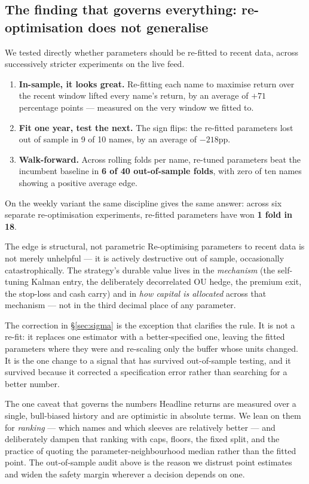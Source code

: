 \documentclass[11pt]{article}
\begin{document}
\subsection{The finding that governs everything: re-optimisation does not generalise}
\label{sec:noreopt}
We tested directly whether parameters should be re-fitted to recent data, across successively
stricter experiments on the live feed.
\begin{enumerate}[topsep=2pt,itemsep=2pt]
\item \textbf{In-sample, it looks great.} Re-fitting each name to maximise return over the recent
      window lifted every name's return, by an average of $+71$ percentage points --- measured on
      the very window we fitted to.
\item \textbf{Fit one year, test the next.} The sign flips: the re-fitted parameters lost out of
      sample in 9 of 10 names, by an average of $-218$pp.
\item \textbf{Walk-forward.} Across rolling folds per name, re-tuned parameters beat the
      incumbent baseline in \textbf{6 of 40 out-of-sample folds}, with zero of ten names showing
      a positive average edge.
\end{enumerate}
On the weekly variant the same discipline gives the same answer: across six separate
re-optimisation experiments, re-fitted parameters have won \textbf{1 fold in 18}.

\begin{keybox}{The edge is structural, not parametric}
Re-optimising parameters to recent data is not merely unhelpful --- it is actively destructive out
of sample, occasionally catastrophically. The strategy's durable value lives in the
\emph{mechanism} (the self-tuning Kalman entry, the deliberately decorrelated OU hedge, the
premium exit, the stop-loss and cash carry) and in \emph{how capital is allocated} across that
mechanism --- not in the third decimal place of any parameter.

The correction in \S\ref{sec:sigma} is the exception that clarifies the rule. It is not a re-fit:
it replaces one estimator with a better-specified one, leaving the fitted parameters where they
were and re-scaling only the buffer whose units changed. It is the one change to a signal that
has survived out-of-sample testing, and it survived because it corrected a specification error
rather than searching for a better number.
\end{keybox}

\begin{keybox}{The one caveat that governs the numbers}
Headline returns are measured over a single, bull-biased history and are optimistic in absolute
terms. We lean on them for \emph{ranking} --- which names and which sleeves are relatively better
--- and deliberately dampen that ranking with caps, floors, the fixed split, and the practice of
quoting the parameter-neighbourhood median rather than the fitted point. The out-of-sample audit
above is the reason we distrust point estimates and widen the safety margin wherever a decision
depends on one.
\end{keybox}
\end{document}
